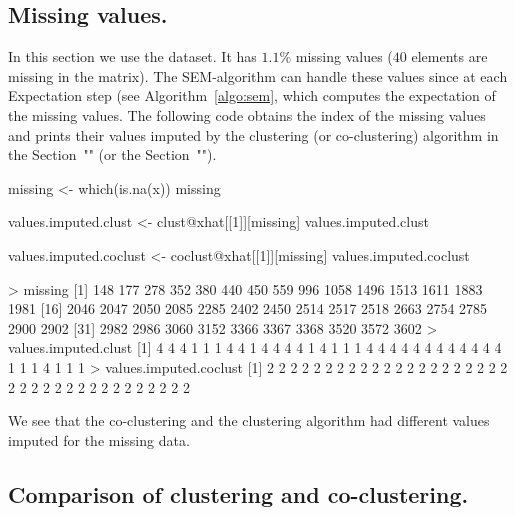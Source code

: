 \subsection{Missing values.}
In this section we use the  dataset. It has $1.1\%$ missing values ($40$ elements are missing in the matrix). The SEM-algorithm can handle these values since at each Expectation step (see Algorithm~\ref{algo:sem}, which computes the expectation of the missing values. The following code obtains the index of the missing values and prints their values imputed by the clustering (or co-clustering) algorithm in the Section~"" (or the Section~"").
\begin{example}
missing <- which(is.na(x))
missing

values.imputed.clust <- clust@xhat[[1]][missing]
values.imputed.clust

values.imputed.coclust <- coclust@xhat[[1]][missing]
values.imputed.coclust
\end{example}
\begin{example}
> missing
 [1]  148  177  278  352  380  440  450  559  996 1058 1496 1513 1611 1883 1981
[16] 2046 2047 2050 2085 2285 2402 2450 2514 2517 2518 2663 2754 2785 2900 2902
[31] 2982 2986 3060 3152 3366 3367 3368 3520 3572 3602
> values.imputed.clust
 [1] 4 4 4 1 1 1 4 4 1 4 4 4 4 1 4 1 1 1 4 4 4 4 4 4 4 4 4 4 4 4 1 1 1 4 1 1 1
> values.imputed.coclust
 [1] 2 2 2 2 2 2 2 2 2 2 2 2 2 2 2 2 2 2 2 2 2 2 2 2 2 2 2 2 2 2 2 2 2 2 2 2 2
\end{example}

We see that the co-clustering and the clustering algorithm had different values imputed for the missing data.


\subsection{Comparison of clustering and co-clustering.}

